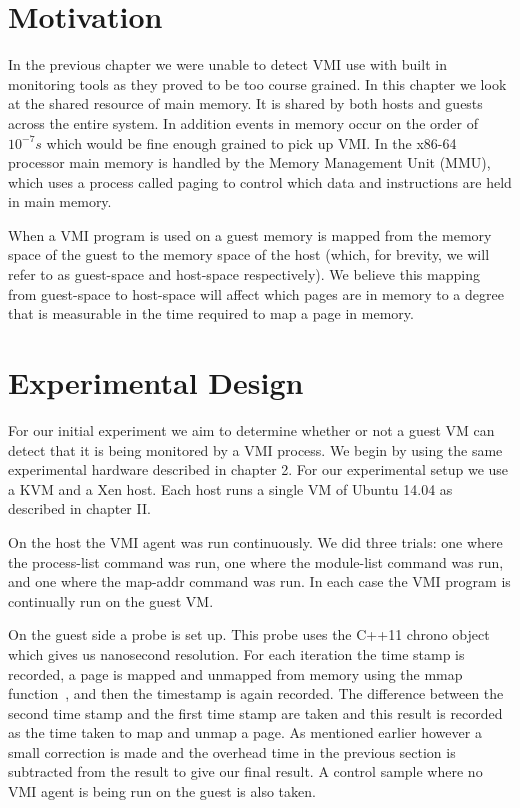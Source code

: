\label{MMapChap}

\section{Motivation}\label{MMapChap-Intro}
In the previous chapter we were unable to detect VMI use with built in monitoring tools as they proved to be too course grained. In this chapter we look at the shared resource of main memory. It is shared by both hosts and guests across the entire system. In addition events in memory occur on the order of $10^{-7} s$ which would be fine enough grained to pick up VMI.   In the x86-64 processor main memory is handled by the Memory Management Unit (MMU), which uses a process called paging to control which data and instructions are held in main memory. 

When a VMI program is used on a guest memory is mapped from the memory space of the guest to the memory space of the host (which, for brevity, we will refer to as guest-space and host-space respectively). We believe this mapping from guest-space to host-space will affect which pages are in memory to a degree that is measurable in the time required to map a page in memory.  


\section{Experimental Design}\label{MMapChap-ExpDesign}

For our initial experiment we aim to determine whether or not a guest VM can detect that it is being monitored by a VMI process. We begin by using the same experimental hardware described in chapter 2.  For our experimental setup we use a KVM and a Xen host. Each host runs a single VM of Ubuntu 14.04 as described in chapter II.  

On the host the VMI agent was run continuously. We did three trials: one where the process-list command was run, one where the module-list command was run, and one where the map-addr command was run. In each case the VMI program is continually run on the guest VM. 


On the guest side a probe is set up. This probe uses the C++11 chrono object~\cite{_chrono_2014} which gives us nanosecond resolution. For each iteration the time stamp is recorded, a page is mapped and unmapped from memory using the mmap function~\cite{_mmap2_2014}, and then the timestamp is again recorded. The difference between the second time stamp and the first time stamp are taken and this result is recorded as the time taken to map and unmap a page. As mentioned earlier however a small correction is made and the overhead time in the previous section is subtracted from the result to give our final result.  A control sample where no VMI agent is being run on the guest is also taken. 


